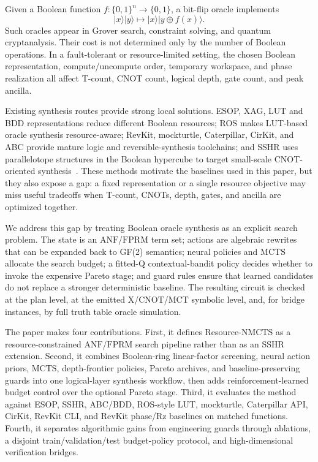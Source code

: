 \documentclass[11pt]{article}
\newcommand{\method}{Resource-NMCTS}
\newcommand{\anf}{\ensuremath{\mathrm{ANF}}}
\newcommand{\fprm}{\ensuremath{\mathrm{FPRM}}}
\newcommand{\mcts}{\ensuremath{\mathrm{MCTS}}}
\newcommand{\xor}{\ensuremath{\oplus}}
\newcommand{\mct}{\ensuremath{\mathrm{MCT}}}
\newcommand{\ttable}{truth table}
\begin{document}
Given a Boolean function $f:\{0,1\}^n\rightarrow\{0,1\}$, a bit-flip oracle
implements
\begin{equation}
  |x\rangle |y\rangle \mapsto |x\rangle |y\xor f(x)\rangle .
  \label{eq:oracle}
\end{equation}
Such oracles appear in Grover search, constraint solving, and quantum
cryptanalysis.  Their cost is not determined only by the number of Boolean
operations.  In a fault-tolerant or resource-limited setting, the chosen
Boolean representation, compute/uncompute order, temporary workspace, and
phase realization all affect T-count, CNOT count, logical depth, gate count,
and peak ancilla.

Existing synthesis routes provide strong local solutions.  ESOP, XAG, LUT and
BDD representations reduce different Boolean resources; ROS makes LUT-based
oracle synthesis resource-aware; RevKit, mockturtle, Caterpillar, CirKit, and ABC provide
mature logic and reversible-synthesis toolchains; and SSHR uses parallelotope
structures in the Boolean hypercube to target small-scale CNOT-oriented
synthesis~\cite{meuli2020ros,meuli2022xag,meuli2019multiplicative,wille2009bdd,brayton2010abc,soeken2018epfl,soeken2012revkit,zheng2025sshr,revkit,mockturtle,caterpillar,cirkit}.
These methods motivate the baselines used in this paper, but they also expose a
gap: a fixed representation or a single resource objective may miss useful
tradeoffs when T-count, CNOTs, depth, gates, and ancilla are optimized
together.

We address this gap by treating Boolean oracle synthesis as an explicit search
problem.  The state is an \anf{}/\fprm{} term set; actions are algebraic
rewrites that can be expanded back to GF(2) semantics; neural policies and
\mcts{} allocate the search budget; a fitted-Q contextual-bandit policy
decides whether to invoke the expensive Pareto stage; and guard rules ensure that learned
candidates do not replace a stronger deterministic baseline.  The resulting
circuit is checked at the plan level, at the emitted X/CNOT/\mct{} symbolic
level, and, for bridge instances, by full \ttable{} oracle simulation.

The paper makes four contributions.  First, it defines \method{} as a
resource-constrained \anf{}/\fprm{} search pipeline rather than as an SSHR
extension.  Second, it combines Boolean-ring linear-factor screening, neural
action priors, \mcts{}, depth-frontier policies, Pareto archives, and
baseline-preserving guards into one logical-layer synthesis workflow, then
adds reinforcement-learned budget control over the optional Pareto stage.  Third,
it evaluates the method against ESOP, SSHR, ABC/BDD, ROS-style LUT,
mockturtle, Caterpillar API, CirKit, RevKit CLI, and RevKit phase/Rz baselines on matched
functions.  Fourth, it separates algorithmic gains from engineering guards
through ablations, a disjoint train/validation/test budget-policy protocol,
and high-dimensional verification bridges.
\end{document}
